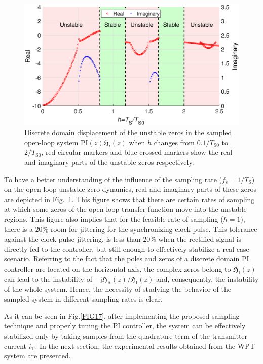 \documentclass[journal,a4paper,10pt,twoside]{IEEEtran} %
\begin{document}
	 \begin{figure}
	     \centering
	     \includegraphics[clip, trim=1cm 0cm 0cm 0.4cm, width=1\columnwidth]{FIGS/FIG19.eps}
	     \caption{Discrete domain displacement of the unstable zeros in the sampled open-loop system $\mathrm{PI}(z)\mathfrak{H}_i(z)$ when $h$ changes from $0.1/T_\mathrm{S0}$ to $2/T_\mathrm{S0}$, red circular markers and blue crossed markers show the real and imaginary parts of the unstable zeros respectively.}
	     \label{FIG19}
	     \vspace{-3mm}
	 \end{figure}
	 
	 To have a better understanding of the influence of the sampling rate ($f_\mathrm{s}=1/T_\mathrm{S}$) on the open-loop {\color{red}unstable zero dynamics}, real and imaginary parts of these zeros are depicted in Fig.~\ref{FIG19}. This figure shows that there are certain rates of sampling at which some zeros of the open-loop transfer function move into the unstable regions. {\color{red}This figure also implies that for the feasible rate of sampling ($h=1$), there is a $20\%$ room for jittering for the synchronizing clock pulse. This tolerance against the clock pulse jittering, is less than $20\%$ when the rectified signal is directly fed to the controller, but still enough to effectively stabilize a real case scenario.} Referring to the fact that the poles and zeros of a discrete domain PI controller are located on the horizontal axis, the complex zeros belong to $\mathfrak{H}_\mathrm{I}(z)$ can lead to the instability of $-\mathrm{j}{\mathfrak{H}_\mathrm{R}(z)}/{\mathfrak{H}_\mathrm{I}(z)}$ and, consequently, the instability of the whole system. Hence, the necessity of studying the behavior of the sampled-system in different sampling rates is clear.
	 
	 As it can be seen in Fig.\ref{FIG17}, after implementing the proposed sampling technique and properly tuning the PI controller, the system can be effectively stabilized only by taking samples from the quadrature term of the transmitter current $i_\mathrm{T}$. 
	 In the next section, the experimental results obtained from the WPT system are presented.
	 
\end{document}
